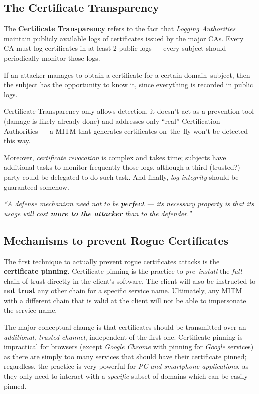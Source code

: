 \documentclass[10pt]{\classname}
\begin{document}
\subsection{The Certificate Transparency}

The \textbf{Certificate Transparency} refers to the fact that \emph{Logging
Authorities} maintain publicly available logs of certificates issued by the major CAs.
Every CA must log certificates in at least 2 public logs --- every subject
should periodically monitor those logs.

If an attacker manages to obtain a certificate for a certain domain\---subject,
then the subject has the opportunity to know it, since everything is recorded
in public logs.

Certificate Transparency only allows detection, it doesn't act as a prevention
tool (damage is likely already done) and addresses only ``real'' Certification
Authorities --- a MITM that generates certificates on--the--fly won't be
detected this way.

Moreover, \emph{certificate revocation} is complex and takes time; subjects
have additional tasks to monitor frequently those logs, although a third
(trusted?) party could be delegated to do such task. And finally, \emph{log
integrity} should be guaranteed somehow.

\vspace*{1cm}
\begin{center}
    \emph{``A defense mechanism need not to be \textbf{perfect} --- its necessary
    property is that its usage will cost \textbf{more to the attacker} than to
the defender.''}
\end{center}
\vspace*{1cm}

\subsection{Mechanisms to prevent Rogue Certificates}

The first technique to actually prevent rogue certificates attacks is the
\textbf{certificate pinning}. Certificate pinning is the practice to
\emph{pre--install} the \emph{full} chain of trust directly in the client's
software. The client will also be instructed to \textbf{not trust} any other
chain for a specific service name. Ultimately, any MITM with a different chain
that is valid at the client will not be able to impersonate the service name.

The major conceptual change is that certificates should be transmitted over an
\emph{additional, trusted channel}, independent of the first one. Certificate
pinning is impractical for browsers (except \emph{Google Chrome} with pinning
for \emph{Google} services) as there are simply too many services that should
have their certificate pinned; regardless, the practice is very powerful for
\emph{PC and smartphone applications}, as they only need to interact with a
\emph{specific} subset of domains which can be easily pinned.
\end{document}
